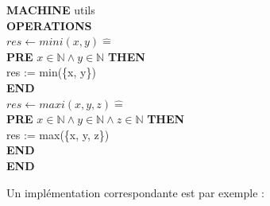 \documentclass[10pt,a4paper]{article}
\newcommand{\Bequal}{\mathrel{\widehat{=}}}
\begin{document}
{\noindent \textbf{MACHINE} utils \\
\textbf{OPERATIONS} \\
$res \leftarrow mini(x, y) \Bequal$ \\
\hspace*{1em}  \textbf{PRE} $x \in \mathbb{N} \wedge  y \in \mathbb{N} $ \textbf{THEN} \\
\hspace*{2em} res := min(\{x, y\})  \\
\hspace*{1em} \textbf{END} \\
$res \leftarrow maxi(x, y, z) \Bequal$ \\
\hspace*{1em}  \textbf{PRE} $x \in \mathbb{N} \wedge  y \in \mathbb{N} \wedge z \in \mathbb{N}$ \textbf{THEN} \\
\hspace*{2em} res := max(\{x, y, z\})  \\
\hspace*{1em} \textbf{END} \\
\textbf{END}

Un implémentation correspondante est par exemple :

}
\end{document}
